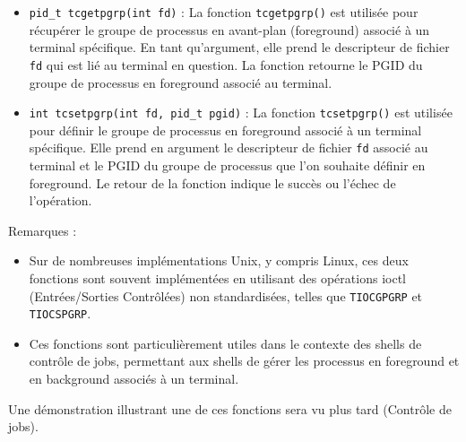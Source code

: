 \begin{itemize}
    \item \texttt{pid\_t tcgetpgrp(int fd)} : La fonction \texttt{tcgetpgrp()} est utilisée pour récupérer le groupe de processus en avant-plan (foreground) associé à un terminal spécifique. En tant qu'argument,
 elle prend le descripteur de fichier \texttt{fd} qui est lié au terminal en question. La fonction retourne le PGID du groupe de processus en foreground associé au terminal.

    \item \texttt{int tcsetpgrp(int fd, pid\_t pgid)} : La fonction \texttt{tcsetpgrp()} est utilisée pour définir le groupe de processus en foreground associé à un terminal spécifique. Elle prend en argument le descripteur de fichier \texttt{fd} associé
 au terminal et le PGID du groupe de processus que l'on souhaite définir en foreground. Le retour de la fonction indique le succès ou l'échec de l'opération.
\end{itemize}

Remarques :
\begin{itemize}
    \item Sur de nombreuses implémentations Unix, y compris Linux, ces deux fonctions sont souvent implémentées en utilisant des opérations ioctl (Entrées/Sorties Contrôlées) non standardisées, telles que \texttt{TIOCGPGRP} et \texttt{TIOCSPGRP}.
    \item Ces fonctions sont particulièrement utiles dans le contexte des shells de contrôle de jobs, permettant aux shells de gérer les processus en foreground et en background associés à un terminal.
\end{itemize}

Une démonstration illustrant une de ces fonctions sera vu plus tard (Contrôle de jobs).




